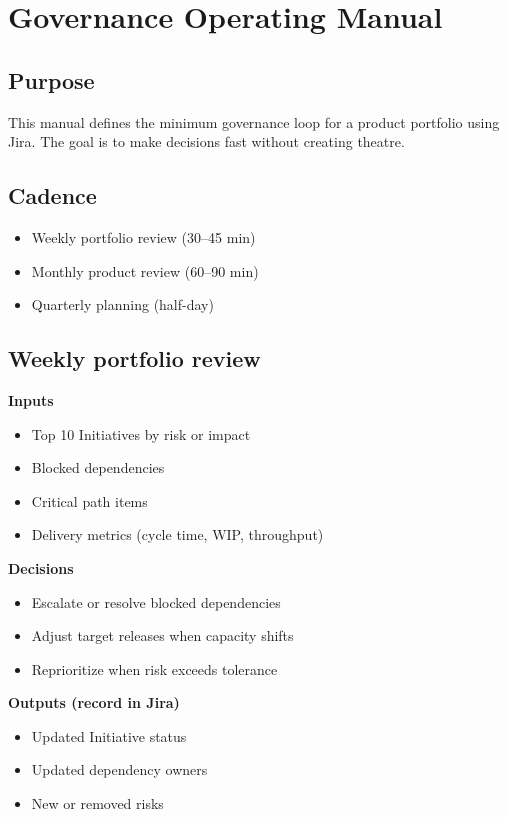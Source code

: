 \section*{Governance Operating Manual}

\subsection*{Purpose}
This manual defines the minimum governance loop for a product portfolio using Jira. The goal is to make decisions fast without creating theatre.

\subsection*{Cadence}
\begin{itemize}
  \item Weekly portfolio review (30--45 min)
  \item Monthly product review (60--90 min)
  \item Quarterly planning (half-day)
\end{itemize}

\subsection*{Weekly portfolio review}
\textbf{Inputs}
\begin{itemize}
  \item Top 10 Initiatives by risk or impact
  \item Blocked dependencies
  \item Critical path items
  \item Delivery metrics (cycle time, WIP, throughput)
\end{itemize}

\textbf{Decisions}
\begin{itemize}
  \item Escalate or resolve blocked dependencies
  \item Adjust target releases when capacity shifts
  \item Reprioritize when risk exceeds tolerance
\end{itemize}

\textbf{Outputs (record in Jira)}
\begin{itemize}
  \item Updated Initiative status
  \item Updated dependency owners
  \item New or removed risks
\end{itemize}

